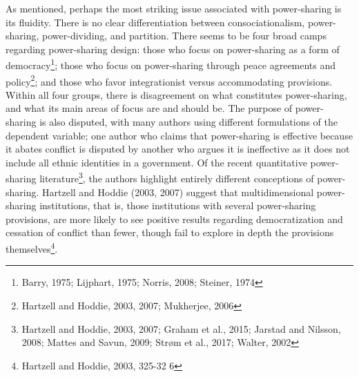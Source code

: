 \documentclass[12pt]{article}
\begin{document}
As mentioned, perhaps the most striking issue associated with power-sharing is its fluidity. There is no clear differentiation between consociationalism, power-sharing, power-dividing, and partition. There seems to be four broad camps regarding power-sharing design: those who focus on power-sharing as a form of democracy\footnote{Barry, 1975; Lijphart, 1975; Norris, 2008; Steiner, 1974}; those who focus on power-sharing through peace agreements and policy\footnote{Hartzell and Hoddie, 2003, 2007; Mukherjee, 2006}; and those who favor integrationist versus accommodating provisions. Within all four groups, there is disagreement on what constitutes power-sharing, and what its main areas of focus are and should be. The purpose of power-sharing is also disputed, with many authors using different formulations of the dependent variable; one author who claims that power-sharing is effective because it abates conflict is disputed by another who argues it is ineffective as it does not include all ethnic identities in a government. Of the recent quantitative power-sharing literature\footnote{Hartzell and Hoddie, 2003, 2007; Graham et al., 2015; Jarstad and Nilsson, 2008; Mattes and Savun, 2009; Strøm et al., 2017; Walter, 2002}, the authors highlight entirely different conceptions of power-sharing. Hartzell and Hoddie (2003, 2007) suggest that multidimensional power-sharing institutions, that is, those institutions with several power-sharing provisions, are more likely to see positive results regarding democratization and cessation of conflict than fewer, though fail to explore in depth the provisions themselves\footnote{Hartzell and Hoddie, 2003, 325-32 6}. 
\end{document}
